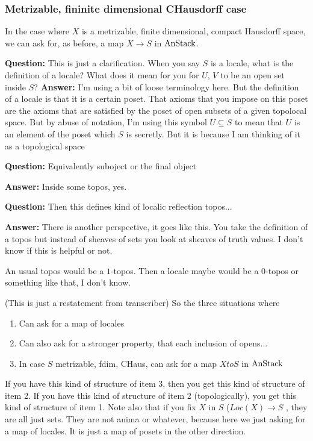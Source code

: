 \subsubsection{Metrizable, fininite dimensional CHausdorff case} \label{subsubsec:metrizable_etc_case}
In the case where $X$ is a metrizable, finite dimensional, compact Hausdorff space, we can ask for, as before, a map $X \to S$ in $\text{AnStack}$.

\textbf{Question:} This is just a clarification. When you say $S$ is a locale, what is the definition of a locale? What does it mean for you for $U$, $V$ to be an open set inside $S$?
\textbf{Answer:} I'm using a bit of loose terminology here. But the definition of a locale is that it is a certain poset. That axioms that you impose on this poset are the axioms that are satisfied by the poset of open subsets of a given topolocal space.
But by abuse of notation, I'm using this symbol $U \subseteq S$ to mean that $U$ is an element of the poset which $S$ is secretly. But it is because I am thinking of it as a topological space 


\textbf{Question:} Equivalently suboject or the final object  

\textbf{Answer:} Inside some topos, yes. 

\textbf{Question:} Then this defines kind of localic reflection topos...


\textbf{Answer:} There is another perspective, it goes like this. You take the definition of a topos but instead of sheaves of sets you look at sheaves of truth values. I don't know if this is helpful or not.

An usual topos would be a $1$-topos. Then a locale maybe would be a $0$-topos or something like that, I don't know.

(This is just a restatement from transcriber)
So the three situations where
\begin{enumerate}
\item Can ask for a map of locales
\item Can also ask for a stronger property, that each inclusion of opens...
\item In case $S$ metrizable, fdim, CHaus, can ask for a map $X to S$ in $\text{AnStack}$
\end{enumerate}


If you have this kind of structure of item 3, then you get this kind of structure of item 2. If you have this kind of structure of item 2 (topologically), you get this kind of structure  of item 1.
Note also that if you fix $X$ in $S$ ($Loc(X) \to S$ ,  they are all just sets. They are not anima or whatever, because here we just asking for a map of locales. It is just a map of posets in the other direction. 


